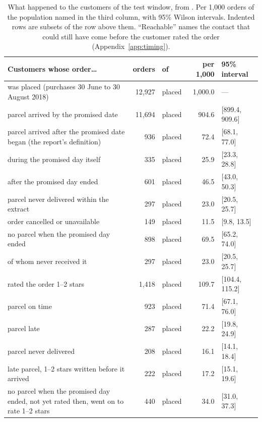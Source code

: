 \begin{table}[htbp]
\centering
\caption{What happened to the customers of the test window, from
. Per 1{,}000 orders of the population named
in the third column, with 95\% Wilson intervals. Indented rows are subsets of
the row above them. ``Reachable'' names the contact that could still have come
before the customer rated the order (Appendix~\ref{app:timing}).}
\label{tab:outcomes}
\footnotesize
\setlength{\tabcolsep}{4pt}
\begin{tabular}{@{}p{8.2cm}rlrl@{}}
\toprule
\textbf{Customers whose order\ldots} & \textbf{orders} & \textbf{of} & \textbf{per 1{,}000} & \textbf{95\% interval} \\
\midrule
was placed (purchases 30 June to 30 August 2018) & 12{,}927 & placed & 1{,}000.0 & --- \\
parcel arrived by the promised date & 11{,}694 & placed & 904.6 & [899.4, 909.6] \\
parcel arrived after the promised date began (the report's definition) & 936 & placed & 72.4 & [68.1, 77.0] \\
\quad during the promised day itself & 335 & placed & 25.9 & [23.3, 28.8] \\
\quad after the promised day ended & 601 & placed & 46.5 & [43.0, 50.3] \\
parcel never delivered within the extract & 297 & placed & 23.0 & [20.5, 25.7] \\
\quad order cancelled or unavailable & 149 & placed & 11.5 & [9.8, 13.5] \\
\addlinespace[2pt]
no parcel when the promised day ended & 898 & placed & 69.5 & [65.2, 74.0] \\
\quad of whom never received it & 297 & placed & 23.0 & [20.5, 25.7] \\
\addlinespace[2pt]
rated the order 1--2 stars & 1{,}418 & placed & 109.7 & [104.4, 115.2] \\
\quad parcel on time & 923 & placed & 71.4 & [67.1, 76.0] \\
\quad parcel late & 287 & placed & 22.2 & [19.8, 24.9] \\
\quad parcel never delivered & 208 & placed & 16.1 & [14.1, 18.4] \\
late parcel, 1--2 stars written before it arrived & 222 & placed & 17.2 & [15.1, 19.6] \\
no parcel when the promised day ended, not yet rated then, went on to rate 1--2 stars & 440 & placed & 34.0 & [31.0, 37.3] \\

\end{tabular}
\end{table}
